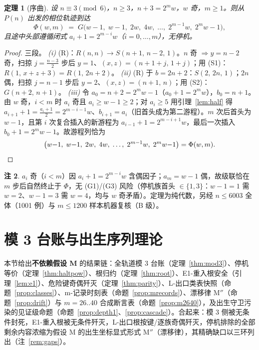 \documentclass[11pt]{ctexart}
\newtheorem{theorem}{定理}[section]
\theoremstyle{definition}
\newtheorem{remark}[theorem]{注}
\begin{document}
\begin{theorem}[序曲]\label{thm:prologue}
设 $n\equiv3\pmod 6$，$n\ge3$，$n{+}3=2^{m}w$，$w$ 奇，$m\ge1$。则从 $P(n)$ 出发的相位轨迹到达
\[
\Phi(w,m)\;=\;G\bigl(w{-}1,\;w{-}1,\;2w,\;4w,\;\dots,\;2^{m-1}w,\;2^{m}w{-}1\bigr),
\]
且途中头部遵循闭式 $a_i+1=2^{m-i}w$（$i=0,\dots,m$），无停机。
\end{theorem}
\begin{proof}
三段。
\emph{(i)} (R)：$R(n,n)\to S(n{+}1,\,n{-}2,\,1)$。$n$ 奇 $\Rightarrow y=n{-}2$ 奇，扫掠 $j=\frac{n-3}{2}$ 步后 $y=1$、$(x,z)=(n{+}1{+}j,\,1{+}j)$；用 (S1)：$R(1,\,x{+}z{+}3)=R(1,\,2n{+}2)$。
\emph{(ii)} (R) 于 $b=2n{+}2$：$S(2,\,2n,\,1)$；$2n$ 偶，扫掠 $j=n{-}1$ 步后 $y=2$、$(x,z)=(n{+}1,\,n)$；用 (S2)：$G(n{+}2,\,n{+}1)$。
\emph{(iii)} 令 $a_0=n{+}2=2^{m}w{-}1$（$a_0{+}1=2^m w$），$b_0=n{+}1$。由 $w$ 奇，$i<m$ 时 $a_i$ 奇且 $a_i\ge w{-}1\ge2$；对 $a_i\ge5$ 用引理~\ref{lem:half} 得 $a_{i+1}{+}1=\frac{a_i+1}{2}=2^{m-i-1}w$、$b_{i+1}=a_i$（旧首头成为第二游程）。$m$ 次后首头为 $w{-}1$，且第 $i$ 次复合插入的新游程为 $a_{i-1}{+}1=2^{m-i+1}w$，最后一次插入 $b_0{+}1=2^{m}w{-}1$。故游程列恰为
\[
\bigl(w{-}1,\;w{-}1,\;2w,\;4w,\;\dots,\;2^{m-1}w,\;2^{m}w{-}1\bigr)=\Phi(w,m). \qedhere
\]
\end{proof}

\begin{remark}
$a_i$ 奇（$i<m$）因 $a_i{+}1=2^{m-i}w$ 含偶因子；$a_m=w{-}1$ 偶，故级联恰在 $m$ 步后自然终止于 $\Phi$，无 (G1)/(G3) 风险（停机族首头 $\in\{1,3\}$：$w{-}1=1$ 需 $w{=}2$、$w{-}1=3$ 需 $w{=}4$，均与 $w$ 奇矛盾）。定理为纯代数，另经 $n\le6003$ 全体（1001 例）与 $m\le1200$ 样本机器复核（B 级）。
\end{remark}

\section{模 3 台账与出生序列理论}\label{sec:ledger}

本节给出\textbf{不依赖假设 M} 的结果链：全轨道模 3 台账（定理~\ref{thm:mod3}）、停机等价（定理~\ref{thm:haltpow}）、根归约（定理~\ref{thm:root}）、E1-重入根安全（引理~\ref{lem:e1}）、危险键奇偶歼灭（定理~\ref{thm:parity}）、L-出口类表快照（命题~\ref{prop:classes}）、m-记录时刻表（命题~\ref{prop:mrecords}）、漂移律 $\mathrm{M''}$（命题~\ref{prop:drift}）与 $m{=}26..40$ 合成断言表（命题~\ref{prop:m2640}），及出生守卫污染的见证级命题（命题~\ref{prop:depth1}、\ref{prop:cascade}）。合起来：模 3 侧被无条件封死，E1-重入根被无条件歼灭，L-出口根按键/逐族奇偶歼灭，停机排除的全部剩余内容浓缩为假设 M 的出生坐标显式形式 $\mathrm{M''}$（漂移律），其精确缺口以三环列出（注~\ref{rem:gaps}）。
\end{document}
